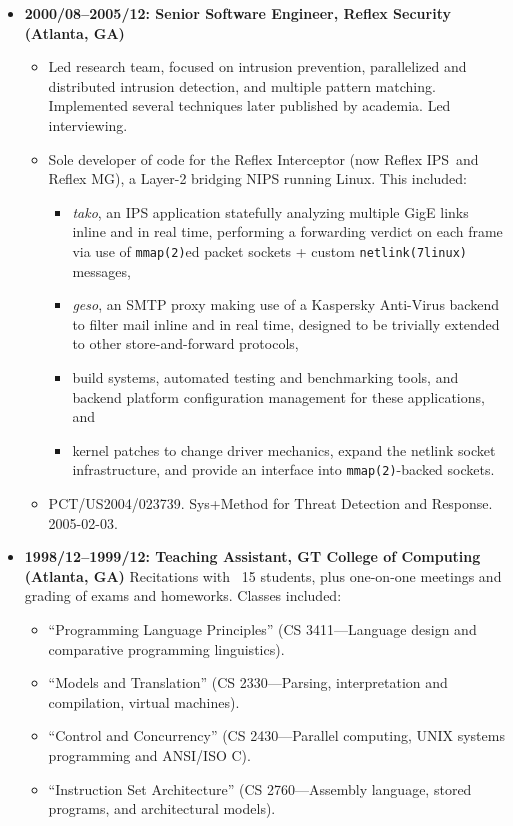 \documentclass{article}
\newenvironment{tightitemize}
{\begin{itemize}
  \setlength{\itemsep}{1pt}
  \setlength{\parskip}{0pt}
  \setlength{\parsep}{0pt}}
{\end{itemize}}
\begin{document}
\begin{tightitemize}
\pagebreak

\item \textbf{2000/08--2005/12: Senior Software Engineer, Reflex Security (Atlanta, GA)}
\begin{tightitemize}
\item Led research team, focused on intrusion prevention, parallelized and
  distributed intrusion detection, and multiple pattern matching. Implemented
  several techniques later published by academia. Led interviewing.
\item Sole developer of code for the Reflex Interceptor (now Reflex IPS\texttrademark\ and
  Reflex MG\texttrademark), a Layer-2 bridging NIPS running Linux. This included:
\begin{tightitemize}
    \item \textit{tako}, an IPS application statefully analyzing multiple GigE links inline
      and in real time, performing a forwarding verdict on each frame via use
      of \texttt{mmap(2)}ed packet sockets + custom \texttt{netlink(7linux)} messages,
    \item \textit{geso}, an SMTP proxy making use of a Kaspersky Anti-Virus backend to
      filter mail inline and in real time, designed to be trivially extended
      to other store-and-forward protocols,
    \item build systems, automated testing and benchmarking tools, and backend
      platform configuration management for these applications, and
    \item kernel patches to change driver mechanics, expand the netlink socket
      infrastructure, and provide an interface into \texttt{mmap(2)}-backed sockets.
\end{tightitemize}
\item PCT/US2004/023739. Sys+Method for Threat Detection and Response. 2005-02-03.
\end{tightitemize}

\item \textbf{1998/12--1999/12: Teaching Assistant, GT College of Computing (Atlanta, GA)}
Recitations with ~15 students, plus one-on-one meetings and grading of exams
and homeworks. Classes included:
\begin{tightitemize}
\item ``Programming Language Principles'' (CS 3411---Language design and comparative programming linguistics).
\item ``Models and Translation'' (CS 2330---Parsing, interpretation and compilation, virtual machines).
\item ``Control and Concurrency'' (CS 2430---Parallel computing, UNIX systems programming and ANSI/ISO C).
\item ``Instruction Set Architecture'' (CS 2760---Assembly language, stored programs, and architectural models).
\end{tightitemize}


\end{tightitemize}
\end{document}
